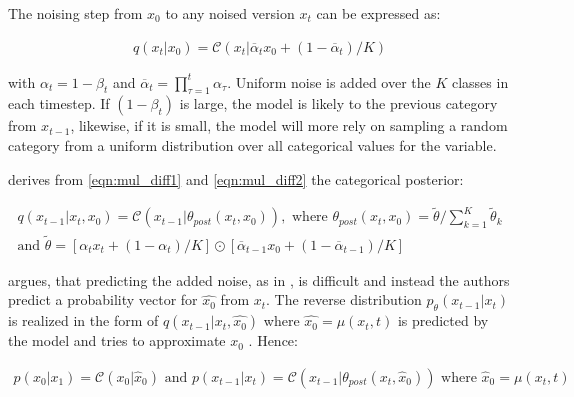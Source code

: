 The noising step from $x_0$ to any noised version $x_t$ can be expressed as:

\begin{equation}
  \begin{align*}
    \label{eqn:mul_diff2}
    q(x_{t}|x_{0}) = \mathcal{C}(x_t|\overline{\alpha}_tx_{0}+(1-\overline{\alpha}_t)/K)
  \end{align*}
\end{equation}

with $\alpha_t = 1-\beta_t$ and $\overline{\alpha}_t = \prod_{\tau=1}^{t}\alpha_\tau$.
Uniform noise is added over the $K$ classes in each timestep.
If $(1-\beta_t)$ is large, the model is likely to the previous category from $x_{t-1}$, likewise, if it is small, 
the model will more rely on sampling a random category from a uniform distribution over all categorical values for the variable.

\cite{hoogeboom2021ArgmaxFlowsMultinomial} derives from \autoref{eqn:mul_diff1} and \autoref{eqn:mul_diff2} the categorical posterior:

\begin{equation}
  \begin{gathered}
  \label{eqn:mul_diff3}
  q(x_{t-1}|x_t, x_{0}) = \mathcal{C}(x_{t-1}|\theta_{post}(x_t,x_0)),\textrm{ where } \theta_{post}(x_t,x_0)=\tilde{\theta}/\sum_{k=1}^{K}\tilde{\theta}_k \\
  \textrm{and } \tilde{\theta} = \left[\alpha_tx_{t}+(1-\alpha_t)/K \right] \odot \left[\overline{\alpha}_{t-1}x_{0}+(1-\overline{\alpha}_{t-1})/K \right]
  \end{gathered}
\end{equation}

\cite{hoogeboom2021ArgmaxFlowsMultinomial} argues, that predicting the added noise, as in \cite{ho2020DenoisingDiffusionProbabilistic},
is difficult and instead the authors predict a probability vector for $\hat{x_0}$ from $x_t$.
The reverse distribution $p_\theta(x_{t-1}|x_t)$ is realized in the form of $q(x_{t-1}|x_t,\hat{x_0})$ where $\hat{x_0}=\mu(x_t, t)$ is predicted by the model and tries to approximate $x_0$ \cite{hoogeboom2021ArgmaxFlowsMultinomial}.
Hence:

\begin{equation}
  \begin{align*}
    \label{eqn:mul_diff4}
    p(x_0|x_1) = \mathcal{C}(x_0|\hat{x}_0) \textrm{ and } p(x_{t-1}|x_t) =  \mathcal{C}(x_{t-1}|\theta_{post}(x_t, \hat{x}_0)) \textrm{ where } \hat{x}_0=\mu(x_t,t)
  \end{align*}
\end{equation}

